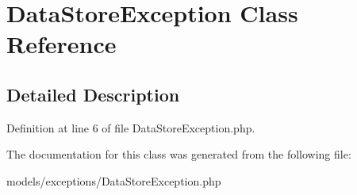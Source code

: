 \hypertarget{class_data_store_exception}{
\section{DataStoreException Class Reference}
\label{class_data_store_exception}
}


\subsection{Detailed Description}


Definition at line 6 of file DataStoreException.php.



The documentation for this class was generated from the following file:\begin{DoxyCompactItemize}
\item 
models/exceptions/DataStoreException.php\end{DoxyCompactItemize}
